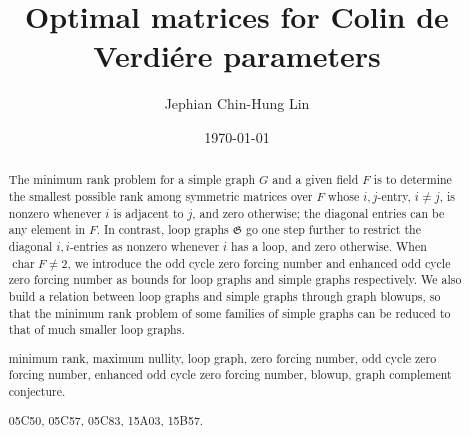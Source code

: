 \documentclass{article}
\def \Fchar {\operatorname{char}}
\def \mfkG{\mathfrak{G}}
\begin{document}
\title{Optimal matrices for Colin de Verdi\'ere parameters}

\author{
        Jephian Chin-Hung Lin\footnotemark[2]
        }

\date{\today}


\maketitle

\renewcommand{\thefootnote}{\fnsymbol{footnote}}
        
\renewcommand{\thefootnote}{\arabic{footnote}}

\begin{abstract}
The minimum rank problem for a simple graph $G$ and a given field $F$ is to determine the smallest possible rank among symmetric matrices over $F$ whose $i,j$-entry, $i\neq j$, is nonzero whenever $i$ is adjacent to $j$, and zero otherwise; the diagonal entries can be any element in $F$.  In contrast, loop graphs $\mfkG$ go one step further to restrict the diagonal $i,i$-entries as nonzero whenever $i$ has a loop, and zero otherwise.  When $\Fchar F\neq 2$, we introduce the odd cycle zero forcing number and enhanced odd cycle zero forcing number as bounds for loop graphs and simple graphs respectively.  We also build a relation between loop graphs and simple graphs through graph blowups, so that the minimum rank problem of some families of simple graphs can be reduced to that of much smaller loop graphs.

minimum rank, maximum nullity, loop graph, zero forcing number, odd cycle zero forcing number, enhanced odd cycle zero forcing number, blowup, graph complement conjecture.

05C50, %
05C57, %
05C83, %
15A03, %
15B57. %
\end{abstract}



{}


%
\end{document}
